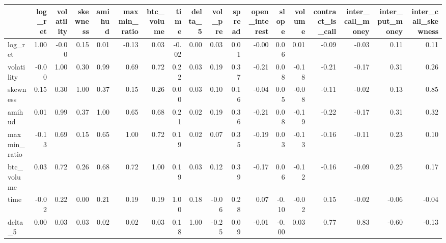 \begin{tabular}{lrrrrrrrrrrrrrrrrr}
\toprule
{} &  log\_ret &  volatility &  skewness &  amihud &  maxmin\_ratio &  btc\_volume &  time &  delta\_5 &  vol\_pre &  spread &  open\_interest &  slope &  volume &  contract\_is\_call &  inter\_call\_money &  inter\_put\_money &  inter\_call\_skewness \\
\midrule
log\_ret             &     1.00 &       -0.00 &      0.15 &    0.01 &         -0.13 &        0.03 & -0.02 &     0.00 &     0.03 &    0.01 &          -0.00 &   0.06 &    0.01 &             -0.09 &             -0.03 &             0.11 &                 0.11 \\
volatility          &    -0.00 &        1.00 &      0.30 &    0.99 &          0.69 &        0.72 &  0.22 &     0.03 &     0.19 &    0.37 &          -0.21 &   0.08 &   -0.18 &             -0.21 &             -0.17 &             0.31 &                 0.26 \\
skewness            &     0.15 &        0.30 &      1.00 &    0.37 &          0.15 &        0.26 &  0.00 &     0.03 &     0.10 &    0.16 &          -0.04 &   0.05 &   -0.08 &             -0.11 &             -0.02 &             0.13 &                 0.85 \\
amihud              &     0.01 &        0.99 &      0.37 &    1.00 &          0.65 &        0.68 &  0.21 &     0.02 &     0.19 &    0.36 &          -0.21 &   0.08 &   -0.19 &             -0.22 &             -0.17 &             0.31 &                 0.32 \\
maxmin\_ratio        &    -0.13 &        0.69 &      0.15 &    0.65 &          1.00 &        0.72 &  0.19 &     0.02 &     0.07 &    0.35 &          -0.19 &   0.03 &   -0.13 &             -0.16 &             -0.11 &             0.23 &                 0.10 \\
btc\_volume          &     0.03 &        0.72 &      0.26 &    0.68 &          0.72 &        1.00 &  0.19 &     0.03 &     0.12 &    0.39 &          -0.17 &   0.06 &   -0.12 &             -0.16 &             -0.09 &             0.25 &                 0.17 \\
time                &    -0.02 &        0.22 &      0.00 &    0.21 &          0.19 &        0.19 &  1.00 &     0.18 &    -0.06 &    0.28 &           0.07 &  -0.10 &   -0.02 &              0.15 &             -0.02 &            -0.06 &                -0.04 \\
delta\_5             &     0.00 &        0.03 &      0.03 &    0.02 &          0.02 &        0.03 &  0.18 &     1.00 &    -0.25 &    0.09 &          -0.01 &  -0.00 &    0.03 &              0.77 &              0.83 &            -0.60 &                -0.13 \\

\end{tabular}
